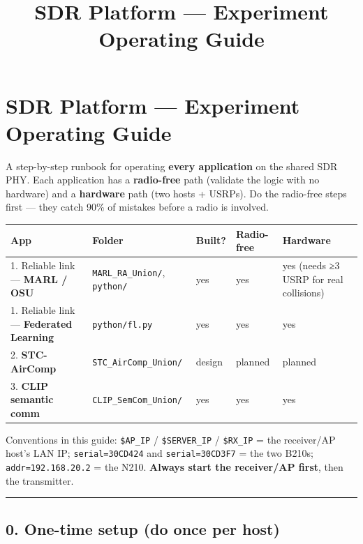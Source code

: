 \documentclass[
  9.5pt,
]{article}
\title{SDR Platform — Experiment Operating Guide}
\author{}
\date{}
\begin{document}
\maketitle

{
\hypersetup{linkcolor=}
\setcounter{tocdepth}{2}
\tableofcontents
}
\hypertarget{sdr-platform--experiment-operating-guide}{%
\section{SDR Platform --- Experiment Operating
Guide}\label{sdr-platform--experiment-operating-guide}}

A step-by-step runbook for operating \textbf{every application} on the
shared SDR PHY. Each application has a \textbf{radio-free} path
(validate the logic with no hardware) and a \textbf{hardware} path (two
hosts + USRPs). Do the radio-free steps first --- they catch 90\% of
mistakes before a radio is involved.

\begin{longtable}[]{@{}lllll@{}}
\toprule
App & Folder & Built? & Radio-free & Hardware \\
\midrule
\endhead
1. Reliable link --- \textbf{MARL / OSU} & \texttt{MARL\_RA\_Union/},
\texttt{python/} & yes & yes & yes (needs ≥3 USRP for real
collisions) \\
1. Reliable link --- \textbf{Federated Learning} & \texttt{python/fl.py}
& yes & yes & yes \\
2. \textbf{STC-AirComp} & \texttt{STC\_AirComp\_Union/} & design &
planned & planned \\
3. \textbf{CLIP semantic comm} & \texttt{CLIP\_SemCom\_Union/} & yes &
yes & yes \\
\bottomrule
\end{longtable}

Conventions in this guide: \texttt{\$AP\_IP} / \texttt{\$SERVER\_IP} /
\texttt{\$RX\_IP} = the receiver/AP host's LAN IP;
\texttt{serial=30CD424} and \texttt{serial=30CD3F7} = the two B210s;
\texttt{addr=192.168.20.2} = the N210. \textbf{Always start the
receiver/AP first}, then the transmitter.

\begin{center}\rule{0.5\linewidth}{0.5pt}\end{center}

\hypertarget{0-one-time-setup-do-once-per-host}{%
\subsection{0. One-time setup (do once per
host)}\label{0-one-time-setup-do-once-per-host}}
\end{document}
